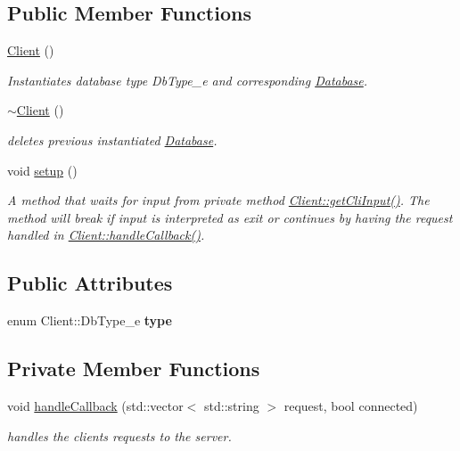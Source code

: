 \subsection*{Public Member Functions}
\begin{DoxyCompactItemize}
\item 
\hyperlink{classClient_ae51af7aa6b8f591496a8f6a4a87a14bf}{Client} ()
\begin{DoxyCompactList}\small\item\em Instantiates database type Db\+Type\+\_\+e and corresponding \hyperlink{classDatabase}{Database}. \end{DoxyCompactList}\item 
\hyperlink{classClient_a840e519ca781888cbd54181572ebe3a7}{$\sim$\+Client} ()
\begin{DoxyCompactList}\small\item\em deletes previous instantiated \hyperlink{classDatabase}{Database}. \end{DoxyCompactList}\item 
void \hyperlink{classClient_a33b0b1f7391689c68fa125549e8c5dcc}{setup} ()
\begin{DoxyCompactList}\small\item\em A method that waits for input from private method \hyperlink{classClient_a62807c316030505b03b90186d3b06a25}{Client\+::get\+Cli\+Input()}. The method will break if input is interpreted as exit or continues by having the request handled in \hyperlink{classClient_a12334d98c376fbdf577d1dfa6bf9a4c0}{Client\+::handle\+Callback()}. \end{DoxyCompactList}\end{DoxyCompactItemize}
\subsection*{Public Attributes}
\begin{DoxyCompactItemize}
\item 
\mbox{\label{classClient_a3f36c2ec59a9d6840acbc89911e61d98}} 
enum Client\+::\+Db\+Type\+\_\+e {\bfseries type}
\end{DoxyCompactItemize}
\subsection*{Private Member Functions}
\begin{DoxyCompactItemize}
\item 
void \hyperlink{classClient_a12334d98c376fbdf577d1dfa6bf9a4c0}{handle\+Callback} (std\+::vector$<$ std\+::string $>$ request, bool connected)
\begin{DoxyCompactList}\small\item\em handles the clients requests to the server. \end{DoxyCompactList}\end{DoxyCompactItemize}
